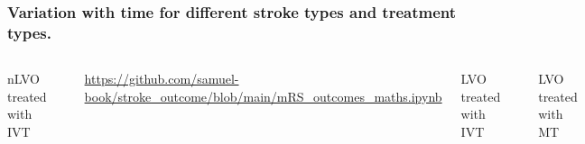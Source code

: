 \documentclass[xcolor={usenames,dvipsnames}]{beamer}
\newcommand{\smallurl}[1]{\textcolor{blue}{\fontsize{4pt}{4.8pt}\selectfont \url{#1}}}
\begin{document}
\begin{frame}
\frametitle{Variation with time for different stroke types and treatment types.}

\begin{columns}
    \footnotesize
    nLVO treated with IVT 
    \begin{center} 
    \includegraphics[width=\textwidth]{./images/probs_with_time_nlvo_ivt}
    \end{center} 
    \vspace{1em}
    \smallurl{https://github.com/samuel-book/stroke_outcome/blob/main/mRS_outcomes_maths.ipynb}

    LVO treated with IVT
    \begin{center} 
    \includegraphics[width=\textwidth]{./images/probs_with_time_lvo_ivt}
    \end{center} 
    LVO treated with MT 
    \begin{center} 
    \includegraphics[width=\textwidth]{./images/probs_with_time_lvo_mt}
    \end{center} 
\end{columns}




\end{frame}
\end{document}
